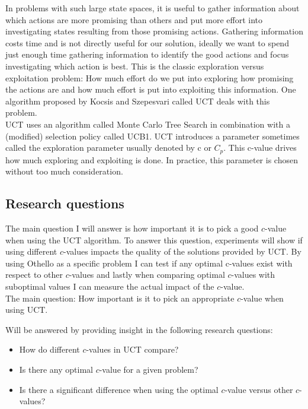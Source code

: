 \documentclass[11pt,a4paper]{article}
\begin{document}
In problems with such large state spaces, it is useful to gather information about which actions are more promising than others and put more effort into investigating states resulting from those promising actions. Gathering information costs time and is not directly useful for our solution, ideally we want to spend just enough time gathering information to identify the good actions and focus investigating which action is best. This is the classic exploration versus exploitation problem: How much effort do we put into exploring how promising the actions are and how much effort is put into exploiting this information. One algorithm proposed by Kocsis and Szepesvari\cite{Kocsis:2006} called UCT deals with this problem.\\

UCT uses an algorithm called Monte Carlo Tree Search in combination with a (modified)  selection policy called UCB1. UCT introduces a parameter sometimes called the exploration parameter usually denoted by c or $C_p$. This c-value drives how much exploring and exploiting is done. In practice, this parameter is chosen without too much consideration.\\

\subsection{Research questions}
The main question I will answer is how important it is to pick a good $c$-value when using the UCT algorithm. To answer this question, experiments will show if using different $c$-values impacts the quality of the solutions provided by UCT. By using Othello as a specific problem I can test if any optimal c-values exist with respect to other $c$-values and lastly when comparing optimal $c$-values with suboptimal values I can measure the actual impact of the $c$-value.\\

The main question: How important is it to pick an appropriate $c$-value when using UCT.

Will be answered by providing insight in the following research questions:
\begin{itemize}
	\item How do different $c$-values in UCT compare?
	\item Is there any optimal $c$-value for a given problem?
	\item Is there a significant difference when using the optimal $c$-value versus other $c$-values?
\end{itemize}
\end{document}
